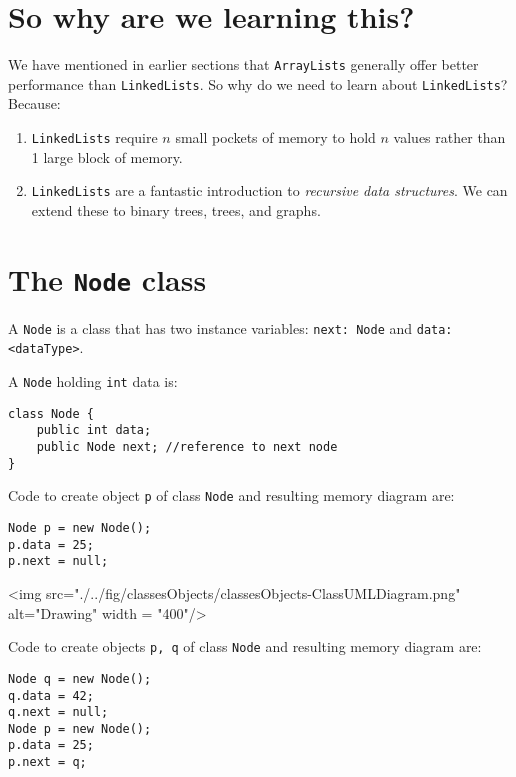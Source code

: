 \def\topic{Linked Lists}

 
\section{So why are we learning this?}

We have mentioned in earlier sections that \texttt{ArrayLists} generally offer better performance than \texttt{LinkedLists}. So why do we need to learn about \texttt{LinkedLists}? Because:

\begin{enumerate}
\item \texttt{LinkedLists} require $n$ small pockets of memory to hold $n$ values rather than 1 large block of memory.
\item \texttt{LinkedLists} are a fantastic introduction to \textit{recursive data structures}. We can extend these to binary trees, trees, and graphs.
\end{enumerate}

\section{The \texttt{Node} class}

A \texttt{Node} is a class that has two instance variables: \texttt{next: Node} and \texttt{data: <dataType>}. 

A \texttt{Node} holding \texttt{int} data is:

\begin{lstlisting}
class Node {
	public int data;
	public Node next; //reference to next node
}
\end{lstlisting}

Code to create object \texttt{p} of class \texttt{Node} and resulting memory diagram are:

\begin{lstlisting}
Node p = new Node();
p.data = 25;
p.next = null;
\end{lstlisting}


\begin{center}
<img src="./../fig/classesObjects/classesObjects-ClassUMLDiagram.png" alt="Drawing" width = "400"/>
\end{center}

Code to create objects \texttt{p, q} of class \texttt{Node} and resulting memory diagram are:

\begin{lstlisting}
Node q = new Node();
q.data = 42;
q.next = null;
Node p = new Node();
p.data = 25;
p.next = q;
\end{lstlisting}

